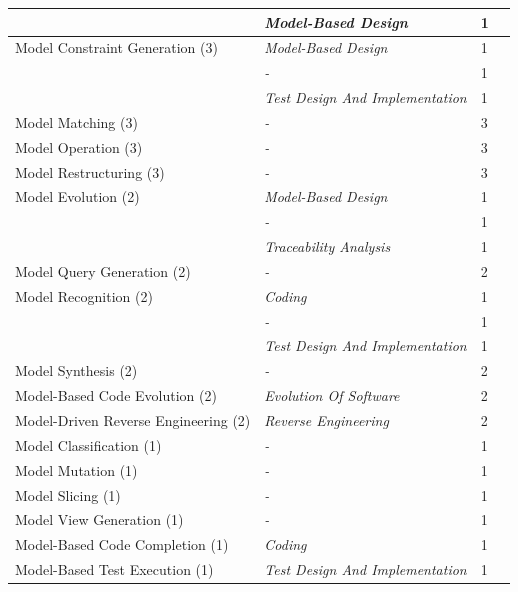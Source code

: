 \begin{tabular} {p{}  p{} p{} p{}}
 & \emph{Model-Based Design} & 1 & \cite{ \paperfourteenth }\\ 
\midrule  
Model Constraint Generation (3) & \emph{Model-Based Design} & 1 & \cite{ \paperseventyeighth }\\ 
 & \emph{-} & 1 & \cite{ \paperonehundredsixth }\\ 
 & \emph{Test Design And Implementation} & 1 & \cite{ \papereightyfourth }\\ 
\midrule  
Model Matching (3) & \emph{-} & 3 & \cite{ \paperseventh,\papertwentieth,\paperonehundredthirtysecond }\\ 
\midrule  
Model Operation (3) & \emph{-} & 3 & \cite{ \paperfiftyfirst,\paperonehundredfortyninth,\papertwohundredfortysixth }\\ 
\midrule  
Model Restructuring (3) & \emph{-} & 3 & \cite{ \paperthirtyfourth,\papertwohundredtwentyfifth,\papertwohundredtwentysixth }\\ 
\midrule  
Model Evolution (2) & \emph{Model-Based Design} & 1 & \cite{ \paperfourteenth }\\ 
 & \emph{-} & 1 & \cite{ \paperonehundredfortysixth }\\ 
 & \emph{Traceability Analysis} & 1 & \cite{ \paperfourteenth }\\ 
\midrule  
Model Query Generation (2) & \emph{-} & 2 & \cite{ \papersixtysixth,\papertwohundredsixth }\\ 
\midrule  
Model Recognition (2) & \emph{Coding} & 1 & \cite{ \papertwohundredthirtyeighth }\\ 
 & \emph{-} & 1 & \cite{ \papertwohundredthirtyseventh }\\ 
 & \emph{Test Design And Implementation} & 1 & \cite{ \papertwohundredthirtyeighth }\\ 
\midrule  
Model Synthesis (2) & \emph{-} & 2 & \cite{ \paperthirtieth,\papertwohundredthirtyninth }\\ 
\midrule  
Model-Based Code Evolution (2) & \emph{Evolution Of Software} & 2 & \cite{ \paperfourteenth,\paperfortyfifth }\\ 
\midrule  
Model-Driven Reverse Engineering (2) & \emph{Reverse Engineering} & 2 & \cite{ \paperfourth,\paperonehundredeightyeighth }\\ 
\midrule  
Model Classification (1) & \emph{-} & 1 & \cite{ \paperonehundredthirtyseventh }\\ 
\midrule  
Model Mutation (1) & \emph{-} & 1 & \cite{ \paperfiftyeighth }\\ 
\midrule  
Model Slicing (1) & \emph{-} & 1 & \cite{ \paperseventysixth }\\ 
\midrule  
Model View Generation (1) & \emph{-} & 1 & \cite{ \paperfiftysecond }\\ 
\midrule  
Model-Based Code Completion (1) & \emph{Coding} & 1 & \cite{ \paperonehundredsecond }\\ 
\midrule  
Model-Based Test Execution (1) & \emph{Test Design And Implementation} & 1 & \cite{ \paperfifteenth }\\ 
\bottomrule 
\end{tabular} 
